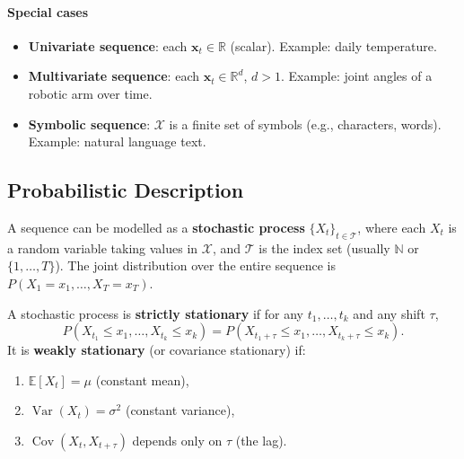 \documentclass{tufte-handout}
\begin{document}
\begin{marginfigure}
\centering
{}
\end{marginfigure}

\paragraph{Special cases}
\begin{itemize}
    \item \textbf{Univariate sequence}: each $\mathbf{x}_t \in \mathbb{R}$ (scalar). Example: daily temperature.
    \item \textbf{Multivariate sequence}: each $\mathbf{x}_t \in \mathbb{R}^d$, $d>1$. Example: joint angles of a robotic arm over time.
    \item \textbf{Symbolic sequence}: $\mathcal{X}$ is a finite set of symbols (e.g., characters, words). Example: natural language text.
\end{itemize}

\subsection{Probabilistic Description}

A sequence can be modelled as a \textbf{stochastic process} $\{X_t\}_{t \in \mathcal{T}}$, where each $X_t$ is a random variable taking values in $\mathcal{X}$, and $\mathcal{T}$ is the index set (usually $\mathbb{N}$ or $\{1,\dots,T\}$). The joint distribution over the entire sequence is $P(X_1 = x_1, \dots, X_T = x_T)$.

\begin{defn}[Stationarity]
    A stochastic process is \textbf{strictly stationary} if for any $t_1,\dots,t_k$ and any shift $\tau$,
    \[
    P(X_{t_1} \le x_1, \dots, X_{t_k} \le x_k) = P(X_{t_1+\tau} \le x_1, \dots, X_{t_k+\tau} \le x_k).
    \]
    It is \textbf{weakly stationary} (or covariance stationary) if:
    \begin{enumerate}
        \item $\mathbb{E}[X_t] = \mu$ (constant mean),
        \item $\operatorname{Var}(X_t) = \sigma^2$ (constant variance),
        \item $\operatorname{Cov}(X_t, X_{t+\tau})$ depends only on $\tau$ (the lag).
    \end{enumerate}
\end{defn}
\end{document}
